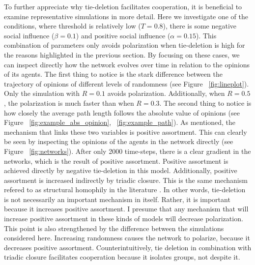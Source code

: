 \documentclass{article}
\begin{document}
To further appreciate why tie-deletion facilitates cooperation, it is beneficial to examine representative simulations in more detail. Here we investigate one of the conditions, where threshold is relatively low ($T = 0.8$), there is some negative social influence ($\beta = 0.1$) and positive social influence ($\alpha = 0.15$). This combination of parameters only avoids polarization when tie-deletion is high for the reasons highlighted in the previous section. By focusing on these cases, we can inspect directly how the network evolves over time in relation to the opinions of its agents. 
The first thing to notice is the stark difference between the trajectory of opinions of different levels of randomness (see Figure ~\ref{fig:lineplot}). Only the simulation with $R=0.1$ avoids polarization. Additionally, when $R=0.5$, the polarization is much faster than when $R=0.3$. The second thing to notice is how closely the average path length follows the absolute value of opinions (see Figure ~\ref{fig:example_abs_opinion}, ~\ref{fig:example_path}). As mentioned, the mechanism that links these two variables is positive assortment. This can clearly be seen by inspecting the opinions of the agents in the network directly (see Figure ~\ref{fig:networks}). After only 2000 time-steps, there is a clear gradient in the networks, which is the result of positive assortment. Positive assortment is achieved directly by negative tie-deletion in this model. Additionally, positive assortment is increased indirectly by triadic closure. This is the same mechanism refered to as structural homophily in the literature \cite{asikainen_cumulative_2020,peixoto_disentangling_2022}. In other words, tie-deletion is not necessarily an important mechanism in itself. Rather, it is important because it increases positive assortment. I presume that any mechanism that will increase positive assortment in these kinds of models will decrease polarization. This point is also strengthened by the difference between the simulations considered here. Increasing randomness causes the network to polarize, because it decreases positive assortment. Counterintuitively, tie deletion in combination with triadic closure facilitates cooperation because it isolates groups, not despite it. 
\end{document}
